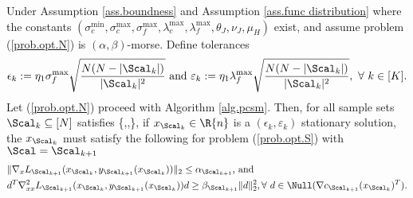 %	

\begin{theorem}
Under Assumption \ref{ass.boundness} and Assumption \ref{ass.func distribution} where the constants $(\sigma_c^{\min},\sigma_c^{\max},\sigma_f^{\max},\lambda_c^{\max},\lambda_f^{\max},\theta_J,\nu_J,\mu_H )$ exist, and assume problem (\ref{prob.opt.N}) is $(\alpha,\beta)$-morse.  Define tolerances 
\[
\epsilon_k:=\eta_1\sigma_f^{\max}\sqrt{\frac{N(N-|\Scal_k|)}{|\Scal_k|^2}}\text{ and }\varepsilon_k:=\eta_1 \lambda_f^{\max}\sqrt{\frac{N(N-|\Scal_k|)}{|\Scal_k|^2}},\ \forall\ k\in[K].
\]
Let (\ref{prob.opt.N}) proceed with Algorithm \ref{alg.pcsm}. Then, for all sample sets $\Scal_k\subseteq[N]$ satisfies
\bequation
\label{eq.theorem2.S}
\le
\min\left\{,,\right\},
\eequation
if $x_{\Scal_k}\in\R{n}$ is a $(\epsilon_k,\varepsilon_k)$ stationary solution, the $x_{\Scal_k}$ must satisfy the following for problem (\ref{prob.opt.S}) with $\Scal=\Scal_{k+1}$
\begin{align*}
	&\|\nabla_xL_{\Scal_{k+1}}(x_{\Scal_{k}},y_{\Scal_{k+1}}(x_{\Scal_k}))\|_2 \le\alpha_{\Scal_{k+1}}\text{, and }\\
	& d^T\nabla^2_{xx}L_{\Scal_{k+1}}(x_{\Scal_{k}},y_{\Scal_{k+1}}(x_{\Scal_k}))d\ge \beta_{\Scal_{k+1}}\|d\|_2^2,\forall \ d\in\Null(\nabla c_{\Scal_{k+1}}(x_{\Scal_k})^T).
\end{align*}
\end{theorem}

